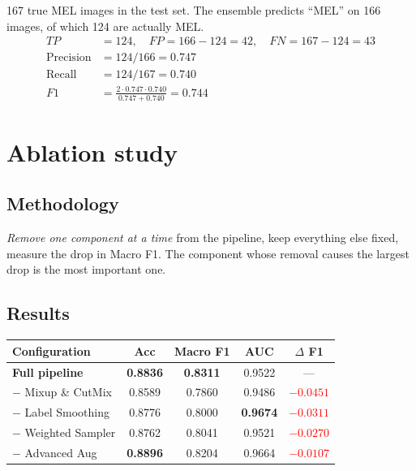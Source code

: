 \documentclass[11pt,a4paper]{article}
\begin{document}
\begin{example}
167 true MEL images in the test set. The ensemble predicts ``MEL'' on 166 images, of which 124 are actually MEL.
\begin{align*}
TP &= 124, \quad FP = 166-124 = 42, \quad FN = 167-124 = 43\\
\mathrm{Precision} &= 124/166 = 0.747\\
\mathrm{Recall} &= 124/167 = 0.740\\
F1 &= \frac{2 \cdot 0.747 \cdot 0.740}{0.747 + 0.740} = \mathbf{0.744}
\end{align*}
\end{example}

\section{Ablation study}

\subsection{Methodology}

\begin{simple}
\textit{Remove one component at a time} from the pipeline, keep everything else fixed, measure the drop in Macro F1. The component whose removal causes the largest drop is the most important one.
\end{simple}

\subsection{Results}

\begin{table}[h]
\centering\small
\begin{tabular}{lcccc}
\toprule
\textbf{Configuration} & \textbf{Acc} & \textbf{Macro F1} & \textbf{AUC} & \textbf{$\Delta$ F1} \\
\midrule
\textbf{Full pipeline} & \textbf{0.8836} & \textbf{0.8311} & 0.9522 & --- \\
\midrule
$-$ Mixup \& CutMix     & 0.8589 & 0.7860 & 0.9486 & \textcolor{red}{$\mathbf{-0.0451}$} \\
$-$ Label Smoothing     & 0.8776 & 0.8000 & \textbf{0.9674} & \textcolor{red}{$-0.0311$} \\
$-$ Weighted Sampler    & 0.8762 & 0.8041 & 0.9521 & \textcolor{red}{$-0.0270$} \\
$-$ Advanced Aug        & \textbf{0.8896} & 0.8204 & 0.9664 & \textcolor{red}{$-0.0107$} \\
\bottomrule
\end{tabular}
\end{table}
\end{document}
